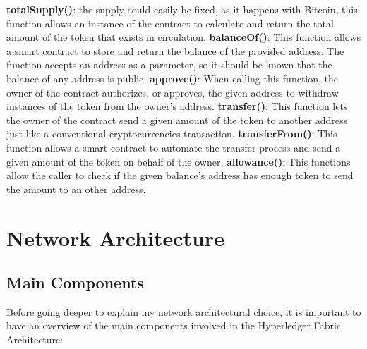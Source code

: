 \begin{outline}
    \1 \textbf{totalSupply()}: the supply could easily be fixed, as it happens with Bitcoin, this function 
    allows an instance of the contract to calculate and return the total amount of the token that exists 
    in circulation.
    \1 \textbf{balanceOf()}: This function allows a smart contract to store and return the balance of 
    the provided address. The function accepts an address as a parameter, so it should be known that 
    the balance of any address is public.
    \1 \textbf{approve()}: When calling this function, the owner of the contract authorizes, or approves, 
    the given address to withdraw instances of the token from the owner’s address.
    \1 \textbf{transfer()}: This function lets the owner of the contract send a given amount of the token 
    to another address just like a conventional cryptocurrencies transaction.
    \1 \textbf{transferFrom()}: This function allows a smart contract to automate the transfer process 
    and send a given amount of the token on behalf of the owner.
    \1 \textbf{allowance()}: This functions allow the caller to check if the given balance's address has 
    enough token to send the amount to an other address.
\end{outline}

\newpage
\section{Network Architecture}

\subsection{Main Components}

Before going deeper to explain my network architectural choice, it is important to have an overview
of the main components involved in the Hyperledger Fabric Architecture:

